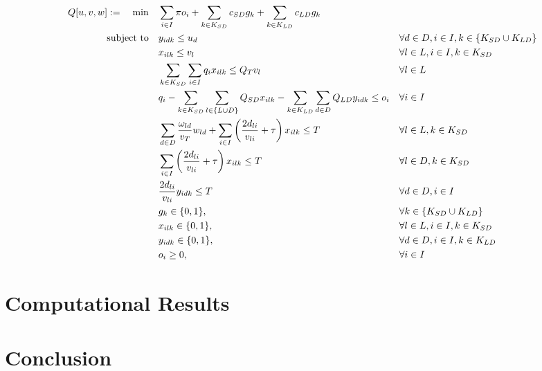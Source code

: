 \documentclass[preprint,review,11pt,authoryear]{elsarticle}
\begin{document}
\begin{subequations}
    \begin{align}
        Q[u,v,w] :=  \quad \min \quad & \sum_{i \in I} \pi o_i + \sum_{k \in K_{SD}} c_{SD} g_k + \sum_{k \in K_{LD}} c_{LD} g_k & & \label{objective:2ndStageObj} \\
                     \operatorname{subject~to} \quad & y_{idk} \leq u_d && \forall d \in D, i \in I, k \in \{K_{SD} \cup K_{LD}\} \label{constraint:DepotOpen}\\
                                      & x_{ilk} \leq v_l && \forall l \in L, i \in I, k \in K_{SD} \label{constraint:LaunchPointOpen} \\
                                      & \sum_{k \in K_{SD}} \sum_{i \in I} q_i x_{ilk} \leq Q_T v_l && \forall l \in L \label{constraint:TrucksCapacity} \\
                                      & q_i - \sum_{k \in K_{SD}}\sum_{l \in \{L \cup D\}} Q_{SD} x_{ilk} - \sum_{k \in K_{LD}}\sum_{d \in D} Q_{LD} y_{idk} \leq o_i && \forall i \in I \label{constraint:UnmetDemand} \\
                                      & \sum_{d \in D} \frac{\omega_{ld}}{v_T} w_{ld} + \sum_{i \in I} \left( \frac{2d_{li}}{v_{li}} + \tau \right) x_{ilk} \leq T && \forall l \in L, k \in K_{SD} \label{constraint:LPTimeLimitSD} \\
                                      & \sum_{i \in I} \left( \frac{2d_{li}}{v_{li}} + \tau \right) x_{ilk} \leq T && \forall l \in D, k \in K_{SD} \label{constraint:DepotTimeLimitSD} \\
                                      & \frac{2d_{li}}{v_{li}} y_{idk} \leq T && \forall d \in D, i \in I \label{constraint:DepotTimeLimitLD} \\
                                      & g_k \in \{0,1\}, && \forall k \in \{K_{SD} \cup K_{LD}\} \label{constraint:gBinary} \\
                                      & x_{ilk} \in \{0,1\}, && \forall l \in L, i \in I, k \in K_{SD} \label{constraint:xBinary} \\
                                      & y_{idk} \in \{0,1\}, && \forall d \in D, i \in I, k \in K_{LD} \label{constraint:yBinary} \\
                                      & o_i \geq 0, && \forall i \in I \label{constraint:UnmetDemandNonNeg}
    \end{align}
\end{subequations}


\section{Computational Results}\label{sec:results}


\section{Conclusion}



\newpage


\end{document}
